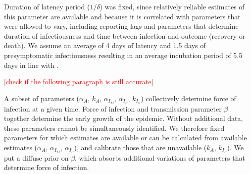 \documentclass[11pt]{article}
\newcommand{\comments}[1]{[\textcolor{red}{#1}]}
\begin{document}
Duration of latency period ($1/\delta$) was fixed, since relatively reliable estimates of this parameter are available and because it is correlated with parameters that were allowed to vary, including reporting lags and parameters that determine duration of infectiousness and time between infection and outcome (recovery or death). We assume an average of 4 days of latency \citep{li2020substantial, salje2020estimating} and 1.5 days of presymptomatic infectiousness \citep{wei2020presymptomatic} resulting in an average incubation period of 5.5 days in line with \citep{lauer2020incubation, bi2020epidemiology, li2020early, linton2020incubation, he2020estimation, salje2020estimating}. 

\comments{check if the following paragraph is still accurate} 

A subset of parameters ($\alpha_A$, $k_A$, $\alpha_{I_M}$, $\alpha_{I_S}$, $k_{I_S}$) collectively determine force of infection at a given time. Force of infection and transmission parameter $\beta$ together
determine the early growth of the epidemic. Without additional data, these parameters cannot be simultaneously identified. We therefore fixed parameters for which estimates are available or can be calculated from available estimates ($\alpha_A$, $\alpha_{I_M}$, $\alpha_{I_S}$), and calibrate those that are unavailable ($k_A$, $k_{I_S}$). We put a diffuse prior on $\beta$, which absorbs additional variations of parameters that determine force of infection. 
\end{document}
